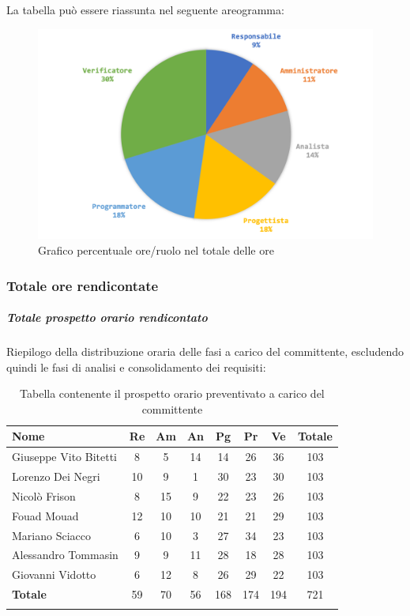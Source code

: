 			La tabella può essere riassunta nel seguente areogramma:
			\begin{figure}[H]
				\centering
				\includegraphics[width=0.8\linewidth]{./images/preventivo/totOre2.png}
				\caption{Grafico percentuale ore/ruolo nel totale delle ore}
				\label{fig:grafico costi ruolo fase totale ore}
			\end{figure}
		
			\subsubsection{Totale ore rendicontate}
				\subparagraph{Totale prospetto orario rendicontato}
				Riepilogo della distribuzione oraria delle fasi a carico del committente, escludendo quindi le fasi di analisi e consolidamento dei requisiti:
				
				\begin{longtable}{|l|c|c|c|c|c|c|c|}
					\hline
					\rowcolor{lighter-grayer}
					\textbf{Nome} & \textbf{Re} & \textbf{Am} & \textbf{An} & \textbf{Pg}  & \textbf{Pr}   & \textbf{Ve} & \textbf{Totale} \\
					\hline
					\endfirsthead
					
					\hline
					Giuseppe Vito Bitetti 		& 8 & 5 & 14 & 14 & 26 & 36 & 103\\
					\hline
					\hline
					Lorenzo Dei Negri			& 10 & 9 & 1 & 30 & 23 & 30 & 103\\
					\hline
					\hline
					Nicolò Frison				    & 8 & 15 & 9 & 22 & 23 & 26 & 103\\
					\hline
					\hline
					Fouad Mouad 				 & 12 & 10 & 10 & 21 & 21 & 29 & 103\\
					\hline
					\hline
					Mariano Sciacco 			& 6 & 10 & 3 & 27 & 34 & 23 & 103\\
					\hline
					\hline
					Alessandro Tommasin    & 9 & 9 & 11 & 28 & 18 & 28 & 103\\
					\hline
					\hline
					Giovanni Vidotto 			 & 6 & 12 & 8 & 26 & 29 & 22 & 103\\
					\hline 
					\textbf{Totale}				 & 59 &  70 & 56 & 168 & 174 & 194 & 721\\
					\hline
					\caption{Tabella contenente il prospetto orario preventivato a carico del committente}
				\end{longtable}
				\pagebreak
				
